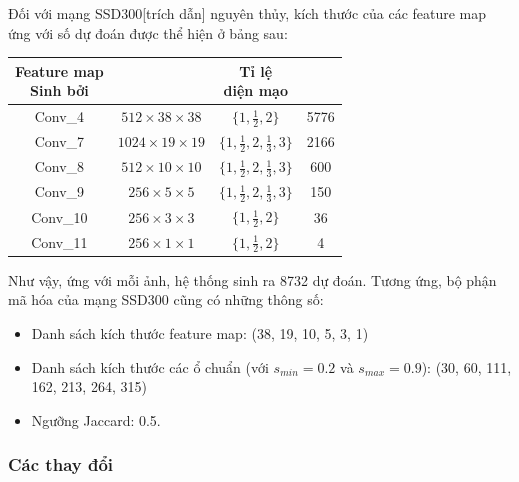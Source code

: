 \documentclass[a4paper,12pt]{article}
\begin{document}
	Đối với mạng SSD300[trích dẫn] nguyên thủy, kích thước của các feature map ứng với số dự đoán được thể hiện ở bảng sau:
	
	\begin{center}
		\begin{tabular}{||c | c | c | c ||} 
			\hline
			\makecell{ Feature map \\ Sinh bởi } & \makecell{ Kích thước} & \makecell{Tỉ lệ \\ diện mạo } &  \makecell{ Số dự đoán } \\ [0.5ex] 
			\hline\hline
			Conv\_4 & $512 \times 38 \times 38$ & $ \{ 1, \frac{1}{2} , 2\} $ & 5776 \\ 
			\hline
			Conv\_7 & $1024 \times 19 \times 19$ & $ \{ 1, \frac{1}{2} , 2, \frac{1}{3}, 3\} $ & 2166 \\ 
			\hline
			Conv\_8 & $512 \times 10 \times 10$ &  $ \{ 1, \frac{1}{2} , 2, \frac{1}{3}, 3\} $ & 600 \\ 
			\hline
			Conv\_9 & $256 \times 5 \times 5 $ &  $ \{ 1, \frac{1}{2} , 2, \frac{1}{3}, 3\} $ & 150  \\ 
			\hline
			Conv\_10 & $256 \times 3 \times 3$ & $ \{ 1, \frac{1}{2} , 2\} $ & 36 \\ 
			\hline
			Conv\_11 & $256 \times 1 \times 1$ & $ \{ 1, \frac{1}{2} , 2\} $ & 4 \\ 
			\hline
		\end{tabular}
	\end{center}
	
	Như vậy, ứng với mỗi ảnh, hệ thống sinh ra 8732 dự đoán. Tương ứng, bộ phận mã hóa của mạng SSD300 cũng có những thông số:
	
	\begin{itemize}
		\item Danh sách kích thước feature map: (38, 19, 10, 5, 3, 1)
		\item Danh sách kích thước các ổ chuẩn (với $s_{min} = 0.2$ và $s_{max} = 0.9$): (30, 60, 111, 162, 213, 264, 315)
		\item Ngưỡng Jaccard: 0.5.
	\end{itemize}
	
	\subsubsection{Các thay đổi}
	
\end{document}
